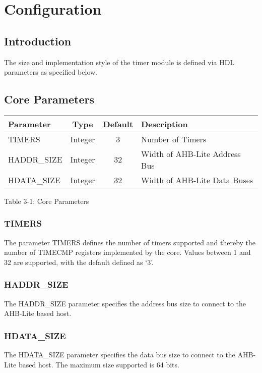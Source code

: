 \chapter{Configuration} \label{configurations}

\section{Introduction}\label{introduction-1}

The size and implementation style of the timer module is defined via HDL
parameters as specified below.

\section{Core Parameters}\label{core-parameters}

\begin{longtable}[]{@{}lccl@{}}
\toprule
Parameter & Type & Default & Description\tabularnewline
\midrule
\endhead
TIMERS & Integer & 3 & Number of Timers\tabularnewline
HADDR\_SIZE & Integer & 32 & Width of AHB-Lite Address
Bus\tabularnewline
HDATA\_SIZE & Integer & 32 & Width of AHB-Lite Data Buses\tabularnewline
\bottomrule
\end{longtable}

\protect\hypertarget{_Toc326677729}{}{}Table 3‑1: Core Parameters

\subsection{TIMERS}\label{timers}

The parameter TIMERS defines the number of timers supported and thereby
the number of TIMECMP registers implemented by the core. Values between
1 and 32 are supported, with the default defined as `3'.

\subsection{HADDR\_SIZE}\label{haddr_size}

The HADDR\_SIZE parameter specifies the address bus size to connect to
the AHB-Lite based host.

\subsection{HDATA\_SIZE}\label{hdata_size}

The HDATA\_SIZE parameter specifies the data bus size to connect to the
AHB-Lite based host. The maximum size supported is 64 bits.

